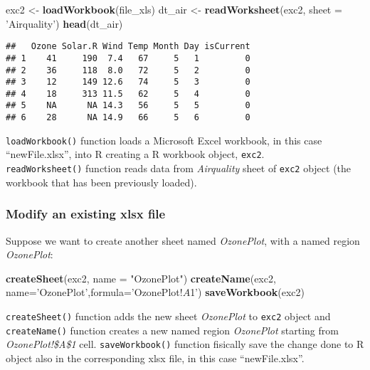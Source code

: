 \documentclass[]{book}
\newenvironment{Shaded}{\begin{snugshade}}{\end{snugshade}}
\newcommand{\KeywordTok}[1]{\textcolor[rgb]{0.13,0.29,0.53}{\textbf{{#1}}}}
\newcommand{\DataTypeTok}[1]{\textcolor[rgb]{0.13,0.29,0.53}{{#1}}}
\newcommand{\StringTok}[1]{\textcolor[rgb]{0.31,0.60,0.02}{{#1}}}
\newcommand{\NormalTok}[1]{{#1}}
\begin{document}
\begin{Shaded}
\begin{Highlighting}[]
\NormalTok{exc2 <-}\StringTok{ }\KeywordTok{loadWorkbook}\NormalTok{(file_xls)}
\NormalTok{dt_air <-}\StringTok{ }\KeywordTok{readWorksheet}\NormalTok{(exc2, }\DataTypeTok{sheet =} \StringTok{'Airquality'}\NormalTok{)}
\KeywordTok{head}\NormalTok{(dt_air)}
\end{Highlighting}
\end{Shaded}

\begin{verbatim}
##   Ozone Solar.R Wind Temp Month Day isCurrent
## 1    41     190  7.4   67     5   1         0
## 2    36     118  8.0   72     5   2         0
## 3    12     149 12.6   74     5   3         0
## 4    18     313 11.5   62     5   4         0
## 5    NA      NA 14.3   56     5   5         0
## 6    28      NA 14.9   66     5   6         0
\end{verbatim}

\texttt{loadWorkbook()} function loads a Microsoft Excel workbook, in
this case ``newFile.xlsx'', into R creating a R workbook object,
\texttt{exc2}.\\
\texttt{readWorksheet()} function reads data from \emph{Airquality}
sheet of \texttt{exc2} object (the workbook that has been previously
loaded).

\subsubsection{Modify an existing xlsx
file}\label{modify-an-existing-xlsx-file}

Suppose we want to create another sheet named \emph{OzonePlot}, with a
named region \emph{OzonePlot}:

\begin{Shaded}
\begin{Highlighting}[]
\KeywordTok{createSheet}\NormalTok{(exc2, }\DataTypeTok{name =} \StringTok{"OzonePlot"}\NormalTok{)}
\KeywordTok{createName}\NormalTok{(exc2, }\DataTypeTok{name=}\StringTok{'OzonePlot'}\NormalTok{,}\DataTypeTok{formula=}\StringTok{'OzonePlot!$A$1'}\NormalTok{)}
\KeywordTok{saveWorkbook}\NormalTok{(exc2)}
\end{Highlighting}
\end{Shaded}

\texttt{createSheet()} function adds the new sheet \emph{OzonePlot} to
\texttt{exc2} object and \texttt{createName()} function creates a new
named region \emph{OzonePlot} starting from \emph{OzonePlot!\$A\$1}
cell. \texttt{saveWorkbook()} function fisically save the change done to
R object also in the corresponding xlsx file, in this case
``newFile.xlsx''.
\end{document}
